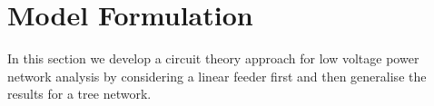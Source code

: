 \documentclass[journal,10pt,onecolumn,draftclsnofoot,]{IEEEtran}
\theoremstyle{plain}
\theoremstyle{definition}
\theoremstyle{remark}
\begin{document}

\section{Model Formulation}

In this section we develop a circuit theory approach for low voltage power network analysis by considering a linear feeder first and then generalise the results for a tree network.
\end{document}
